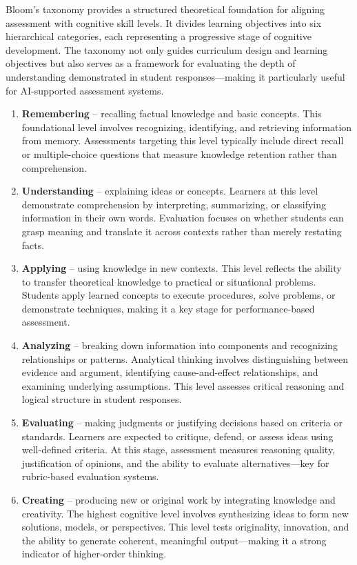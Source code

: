 Bloom’s taxonomy provides a structured theoretical foundation for 
aligning assessment with cognitive skill levels. It divides learning 
objectives into six hierarchical categories, each representing a 
progressive stage of cognitive development. The taxonomy not only 
guides curriculum design and learning objectives but also serves as a 
framework for evaluating the depth of understanding demonstrated in 
student responses—making it particularly useful for AI-supported 
assessment systems.

\begin{enumerate}
    \item \textbf{Remembering} – recalling factual knowledge and basic concepts.  
    This foundational level involves recognizing, identifying, and retrieving information from memory. Assessments targeting this level typically include direct recall or multiple-choice questions that measure knowledge retention rather than comprehension.

    \item \textbf{Understanding} – explaining ideas or concepts.  
    Learners at this level demonstrate comprehension by interpreting, summarizing, or classifying information in their own words. Evaluation focuses on whether students can grasp meaning and translate it across contexts rather than merely restating facts.

    \item \textbf{Applying} – using knowledge in new contexts.  
    This level reflects the ability to transfer theoretical knowledge to practical or situational problems. Students apply learned concepts to execute procedures, solve problems, or demonstrate techniques, making it a key stage for performance-based assessment.

    \item \textbf{Analyzing} – breaking down information into components and recognizing relationships or patterns.  
    Analytical thinking involves distinguishing between evidence and argument, identifying cause-and-effect relationships, and examining underlying assumptions. This level assesses critical reasoning and logical structure in student responses.

    \item \textbf{Evaluating} – making judgments or justifying decisions based on criteria or standards.  
    Learners are expected to critique, defend, or assess ideas using well-defined criteria. At this stage, assessment measures reasoning quality, justification of opinions, and the ability to evaluate alternatives—key for rubric-based evaluation systems.

    \item \textbf{Creating} – producing new or original work by integrating knowledge and creativity.  
    The highest cognitive level involves synthesizing ideas to form new solutions, models, or perspectives. This level tests originality, innovation, and the ability to generate coherent, meaningful output—making it a strong indicator of higher-order thinking.
\end{enumerate}

